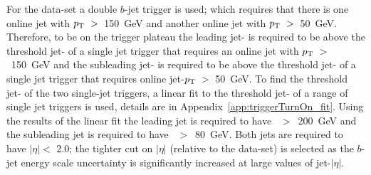 
For the \lm{} data-set a double $b$-jet trigger is used;
which requires that there is one online jet with $p_{\mathrm{T}}~>$~150~GeV and another online jet with $p_{\mathrm{T}}~>$~50~GeV.
Therefore, to be on the trigger plateau the leading jet-\pT{} is required to be above the threshold jet-\pT{}
of a single jet trigger that requires an online jet with $p_{\mathrm{T}}~>$~150~GeV
and the subleading jet-\pT{} is required to be above the threshold jet-\pT{}
of a single jet trigger that requires online jet-$p_{\mathrm{T}}~>$~50~GeV.
To find the threshold jet-\pT{} of the two single-jet triggers,
a linear fit to the threshold jet-\pT{} of a range of single jet triggers is used,
details are in Appendix~\ref{app:triggerTurnOn_fit}.
Using the results of the linear fit the leading jet is required to have \pT{}~$>$~200~GeV
and the subleading jet is required to have \pT{}~$>$~80~GeV.
Both jets  are required to have $|\eta| <$ 2.0;
the tighter cut on $|\eta|$ (relative to the \summer{} data-set) is selected as the
$b$-jet energy scale uncertainty is significantly increased at large values of jet-$|\eta|$.


